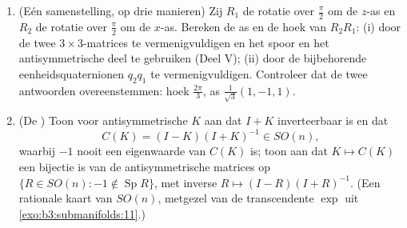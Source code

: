 \begin{problem}
\begin{enumerate}[resume]
  \item (Eén samenstelling, op drie manieren) Zij $R_1$ de
        rotatie over $\frac\pi2$ om de $z$-as en $R_2$ de rotatie
        over $\frac\pi2$ om de $x$-as. Bereken de as en de hoek
        van $R_2R_1$: (i) door de twee $3\times3$-matrices te
        vermenigvuldigen en het spoor en het antisymmetrische
        deel te gebruiken (Deel V); (ii) door de bijbehorende
        eenheidsquaternionen $q_2q_1$ te vermenigvuldigen.
        Controleer dat de twee antwoorden overeenstemmen: hoek
        $\frac{2\pi}3$, as $\frac1{\sqrt3}(1, -1, 1)$.
  \item (De ) Toon voor antisymmetrische $K$
        aan dat $I + K$ inverteerbaar is en dat
        \[
        C(K) = (I - K)(I + K)^{-1} \in SO(n),
        \]
        waarbij $-1$ nooit een eigenwaarde van $C(K)$ is; toon
        aan dat $K \mapsto C(K)$ een bijectie is van de
        antisymmetrische matrices op $\{R \in SO(n) : -1 \notin
        \operatorname{Sp}R\}$, met inverse $R \mapsto (I -
        R)(I + R)^{-1}$. (Een rationale kaart van $SO(n)$,
        metgezel van de transcendente $\exp$ uit
        \cref{exo:b3:submanifolds:11}.)
\end{enumerate}
\end{problem}
